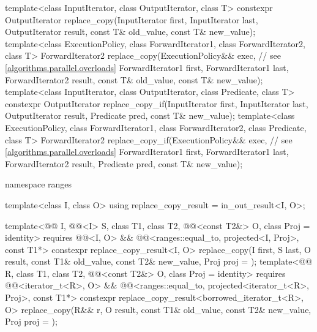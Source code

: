 \begin{codeblock}
{  template<class InputIterator, class OutputIterator, class T>
    constexpr OutputIterator replace_copy(InputIterator first, InputIterator last,
                                          OutputIterator result,
                                          const T& old_value, const T& new_value);
  template<class ExecutionPolicy, class ForwardIterator1, class ForwardIterator2, class T>
    ForwardIterator2 replace_copy(ExecutionPolicy&& exec,       // see \ref{algorithms.parallel.overloads}
                                  ForwardIterator1 first, ForwardIterator1 last,
                                  ForwardIterator2 result,
                                  const T& old_value, const T& new_value);
  template<class InputIterator, class OutputIterator, class Predicate, class T>
    constexpr OutputIterator replace_copy_if(InputIterator first, InputIterator last,
                                             OutputIterator result,
                                             Predicate pred, const T& new_value);
  template<class ExecutionPolicy, class ForwardIterator1, class ForwardIterator2,
           class Predicate, class T>
    ForwardIterator2 replace_copy_if(ExecutionPolicy&& exec,    // see \ref{algorithms.parallel.overloads}
                                     ForwardIterator1 first, ForwardIterator1 last,
                                     ForwardIterator2 result,
                                     Predicate pred, const T& new_value);

  namespace ranges {
    template<class I, class O>
      using replace_copy_result = in_out_result<I, O>;

    template<@@ I, @@<I> S, class T1, class T2,
             @@<const T2&> O, class Proj = identity>
      requires @@<I, O> &&
               @@<ranges::equal_to, projected<I, Proj>, const T1*>
      constexpr replace_copy_result<I, O>
        replace_copy(I first, S last, O result, const T1& old_value, const T2& new_value,
                     Proj proj = {});
    template<@@ R, class T1, class T2, @@<const T2&> O,
             class Proj = identity>
      requires @@<iterator_t<R>, O> &&
               @@<ranges::equal_to,
                                         projected<iterator_t<R>, Proj>, const T1*>
      constexpr replace_copy_result<borrowed_iterator_t<R>, O>
        replace_copy(R&& r, O result, const T1& old_value, const T2& new_value,
                     Proj proj = {});

}}
\end{codeblock}
